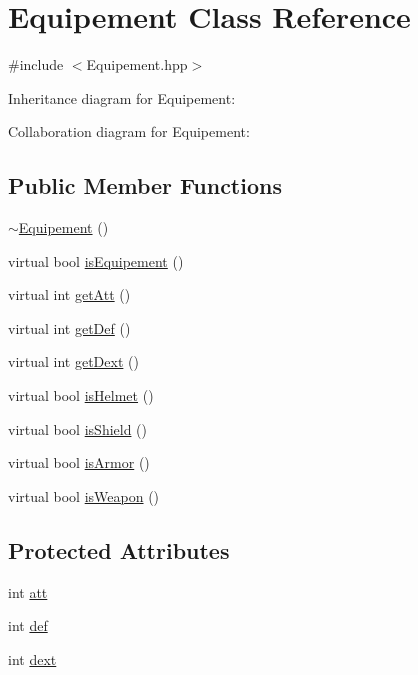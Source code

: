 \hypertarget{classEquipement}{\section{Equipement Class Reference}
\label{classEquipement}
}


{\ttfamily \#include $<$Equipement.\-hpp$>$}



Inheritance diagram for Equipement\-:


Collaboration diagram for Equipement\-:
\subsection*{Public Member Functions}
\begin{DoxyCompactItemize}
\item 
\hyperlink{classEquipement_ae7751a52f2665d9e4b3e2cd6929bd986}{$\sim$\-Equipement} ()
\item 
virtual bool \hyperlink{classEquipement_af610185f2c5de11ca0bc2a8ce2a33ca7}{is\-Equipement} ()
\item 
virtual int \hyperlink{classEquipement_ab546b168d8f5b54e284edf4ab1ae83d4}{get\-Att} ()
\item 
virtual int \hyperlink{classEquipement_a241facc1b1535325159466841f2f33b0}{get\-Def} ()
\item 
virtual int \hyperlink{classEquipement_abb2fa5ce2ae0f4c09a1629ccd6f2712f}{get\-Dext} ()
\item 
virtual bool \hyperlink{classEquipement_a365519a07bd4174fd2f2d7599d7bb958}{is\-Helmet} ()
\item 
virtual bool \hyperlink{classEquipement_a54df0547364f60076567ebd92d901d35}{is\-Shield} ()
\item 
virtual bool \hyperlink{classEquipement_a58257744d709a3f7889e319ba40417b1}{is\-Armor} ()
\item 
virtual bool \hyperlink{classEquipement_a9a35cf9e1f015bf4c5e943c494fbe09b}{is\-Weapon} ()
\end{DoxyCompactItemize}
\subsection*{Protected Attributes}
\begin{DoxyCompactItemize}
\item 
int \hyperlink{classEquipement_ac47f0f7d35dfea97ce2d39b58b4fa4c3}{att}
\item 
int \hyperlink{classEquipement_a752a20a1c7af822f8ad4415a446c6560}{def}
\item 
int \hyperlink{classEquipement_a35089a4e7aeec9c99d57882e363284ee}{dext}
\end{DoxyCompactItemize}


